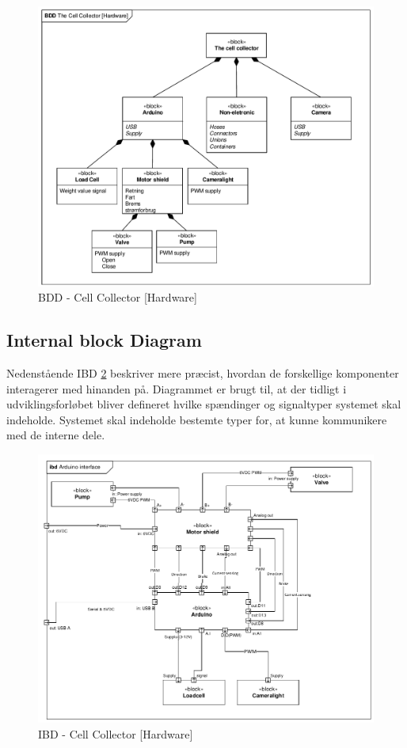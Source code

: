 \begin{figure}[H]
	\centering
	\includegraphics[width=1\textwidth]{pdf/BDD_Hardware_4315_cropped.pdf}
	\caption{BDD - Cell Collector [Hardware]}
	\label{fig:bdd_Hardware}
\end{figure}

\newpage
\subsection{Internal block Diagram} 
Nedenstående IBD \ref{fig:ibd_Hardware} beskriver mere præcist, hvordan de forskellige komponenter interagerer med hinanden på. Diagrammet er brugt til, at der tidligt i udviklingsforløbet bliver defineret hvilke spændinger og signaltyper systemet skal indeholde. Systemet skal indeholde bestemte typer for, at kunne kommunikere med de interne dele.


\begin{figure}[H]
	\centering
	\includegraphics[width=1\textwidth]{pdf/IBD_Hardware(Arduino)_cropped.pdf}
	\caption{IBD - Cell Collector [Hardware]}
	\label{fig:ibd_Hardware}
\end{figure}

